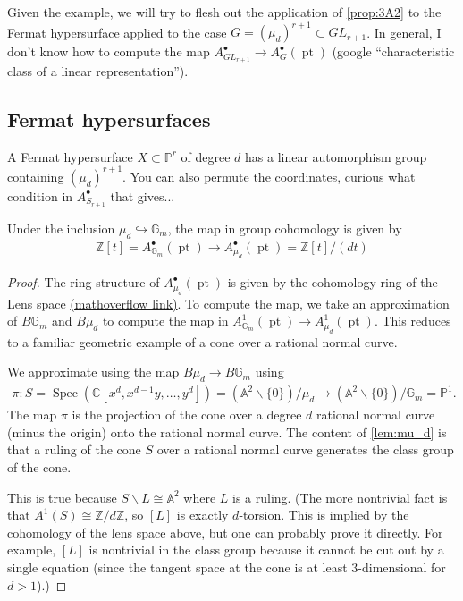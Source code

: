 \documentclass[12pt,reqno]{amsart}
\renewcommand{\to}{{\longrightarrow}}
\numberwithin{equation}{section}
\begin{document}
Given the example, we will try to flesh out the application of \autoref{prop:3A2} to the Fermat hypersurface applied to the case $G=(\mu_d)^{r+1}\subset GL_{r+1}$. In general, I don't know how to compute the map $A^{\bullet}_{GL_{r+1}}\to A^{\bullet}_{G}(\operatorname{pt})$ (google ``characteristic class of a linear representation''). 

\subsection{Fermat hypersurfaces}
A Fermat hypersurface $X\subset \mathbb{P}^r$ of degree $d$ has a linear automorphism group containing $(\mu_d)^{r+1}$. {\color{red} You can also permute the coordinates, curious what condition in $A^{\bullet}_{S_{r+1}}$ that gives...}

\begin{lemma}
\label{lem:mu_d}
Under the inclusion $\mu_d\hookrightarrow \mathbb{G}_m$, the map in group cohomology is given by 
\begin{align*}
    \mathbb{Z}[t]=A^{\bullet}_{\mathbb{G}_m}(\operatorname{pt})\to A^{\bullet}_{\mu_d}(\operatorname{pt})=\mathbb{Z}[t]/(dt)
\end{align*}
\end{lemma}

\begin{proof}
The ring structure of $A^{\bullet}_{\mu_d}(\operatorname{pt})$ is given by the cohomology ring of the Lens space 
\href{https://mathoverflow.net/questions/133974/reference-for-ring-structure-on-group-cohomology}{(mathoverflow link)}. To compute the map, we take an approximation of $B\mathbb{G}_m$ and $B\mu_d$ to compute the map in $A^{1}_{\mathbb{G}_m}(\operatorname{pt})\to A^{1}_{\mu_d}(\operatorname{pt})$. This reduces to a familiar geometric example of a cone over a rational normal curve.

We approximate using the map $B\mu_d\to B\mathbb{G}_m$ using
\begin{align*}
    \pi: S=\operatorname{Spec}(\mathbb{C}[x^d, x^{d-1}y,\ldots,y^d])=(\mathbb{A}^2\backslash\{0\})/\mu_d\to (\mathbb{A}^2\backslash\{0\})/\mathbb{G}_m=\mathbb{P}^1. 
\end{align*}
The map $\pi$ is the projection of the cone over a degree $d$ rational normal curve (minus the origin) onto the rational normal curve. The content of \autoref{lem:mu_d} is that a ruling of the cone $S$ over a rational normal curve generates the class group of the cone. 

This is true because $S\backslash L\cong \mathbb{A}^2$ where $L$ is a ruling. (The more nontrivial fact is that $A^{1}(S)\cong \mathbb{Z}/d\mathbb{Z}$, so $[L]$ is exactly $d$-torsion. This is implied by the cohomology of the lens space above, but one can probably prove it directly. For example, $[L]$ is nontrivial in the class group because it cannot be cut out by a single equation (since the tangent space at the cone is at least 3-dimensional for $d>1$).) 
\end{proof}
\end{document}

